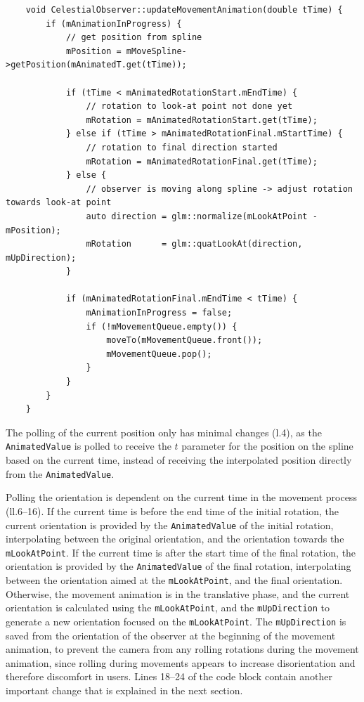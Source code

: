 \begin{verbatim}
    void CelestialObserver::updateMovementAnimation(double tTime) {
        if (mAnimationInProgress) {
            // get position from spline
            mPosition = mMoveSpline->getPosition(mAnimatedT.get(tTime));

            if (tTime < mAnimatedRotationStart.mEndTime) {
                // rotation to look-at point not done yet
                mRotation = mAnimatedRotationStart.get(tTime);
            } else if (tTime > mAnimatedRotationFinal.mStartTime) {
                // rotation to final direction started
                mRotation = mAnimatedRotationFinal.get(tTime);
            } else {
                // observer is moving along spline -> adjust rotation towards look-at point
                auto direction = glm::normalize(mLookAtPoint - mPosition);
                mRotation      = glm::quatLookAt(direction, mUpDirection);
            }

            if (mAnimatedRotationFinal.mEndTime < tTime) {
                mAnimationInProgress = false;
                if (!mMovementQueue.empty()) {
                    moveTo(mMovementQueue.front());
                    mMovementQueue.pop();
                }
            }
        }
    }
\end{verbatim}
The polling of the current position only has minimal changes (l.\@4), as the \texttt{AnimatedValue}
is polled to receive the $t$ parameter for the position on the spline based on the current time, instead of receiving
the interpolated position directly from the \texttt{AnimatedValue}.

Polling the orientation is dependent on the current time in the movement process (ll.\@6--16).
If the current time is before the end time of the initial rotation, the current orientation is provided by the
\texttt{AnimatedValue} of the initial rotation, interpolating between the original orientation, and the
orientation towards the \texttt{mLookAtPoint}.
If the current time is after the start time of the final rotation, the orientation is provided by the
\texttt{AnimatedValue} of the final rotation, interpolating between the orientation aimed at the
\texttt{mLookAtPoint}, and the final orientation.
Otherwise, the movement animation is in the translative phase, and the current orientation is calculated using the 
\texttt{mLookAtPoint}, and the \texttt{mUpDirection} to generate a new orientation focused on the
\texttt{mLookAtPoint}.
The \texttt{mUpDirection} is saved from the orientation of the observer at the beginning of the movement
animation, to prevent the camera from any rolling rotations during the movement animation, since rolling during
movements appears to increase disorientation and therefore discomfort in users.
Lines 18--24 of the code block contain another important change that is explained in the next section.


